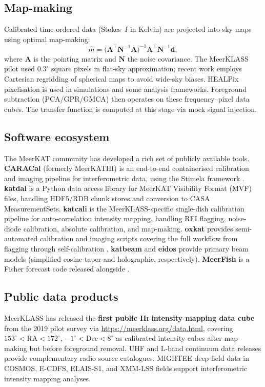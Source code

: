\documentclass[10pt,a4paper]{article}
\begin{document}
\subsection{Map-making}

Calibrated time-ordered data (Stokes~$I$ in Kelvin) are projected into sky
maps using optimal map-making:
\begin{equation}
  \hat{m} = \bigl(\mathbf{A}^{\!\top}\mathbf{N}^{-1}\mathbf{A}\bigr)^{-1}
  \mathbf{A}^{\!\top}\mathbf{N}^{-1}\mathbf{d},
\end{equation}
where $\mathbf{A}$ is the pointing matrix and $\mathbf{N}$ the noise
covariance.  The MeerKLASS pilot used $0.3^{\circ}$ square pixels in flat-sky
approximation; recent work employs Cartesian regridding of spherical maps to
avoid wide-sky biases.  HEALPix pixelisation is used in simulations and some
analysis frameworks.  Foreground subtraction (PCA/GPR/GMCA) then operates on
these frequency--pixel data cubes.  The transfer function is computed at this
stage via mock signal injection.


\subsection{Software ecosystem}

The MeerKAT community has developed a rich set of publicly available tools.
\textbf{CARACal} (formerly MeerKATHI) is an end-to-end containerised
calibration and imaging pipeline for interferometric data, using the Stimela
framework \citep{Jozsa2020}.  \textbf{katdal} is a Python data access library
for MeerKAT Visibility Format (MVF) files, handling HDF5/RDB chunk stores and
conversion to CASA MeasurementSets.  \textbf{katcali} is the
MeerKLASS-specific single-dish calibration pipeline for auto-correlation
intensity mapping, handling RFI flagging, noise-diode calibration, absolute
calibration, and map-making.  \textbf{oxkat} provides semi-automated
calibration and imaging scripts covering the full workflow from flagging through
self-calibration \citep{Heywood2020}.  \textbf{katbeam} and \textbf{eidos}
provide primary beam models (simplified cosine-taper and holographic,
respectively).  \textbf{MeerFish} is a Fisher forecast code released alongside
\citet{Cunnington2025}.


\subsection{Public data products}

MeerKLASS has released the \textbf{first public H\textsc{i} intensity mapping
data cube} from the 2019 pilot survey via
\url{https://meerklass.org/data.html}, covering
$153^{\circ} < \mathrm{RA} < 172^{\circ}$,
$-1^{\circ} < \mathrm{Dec} < 8^{\circ}$ as calibrated intensity cubes after
map-making but before foreground removal.  UHF and L-band continuum data
releases provide complementary radio source catalogues.  MIGHTEE deep-field
data in COSMOS, E-CDFS, ELAIS-S1, and XMM-LSS fields support interferometric
intensity mapping analyses.
\end{document}
